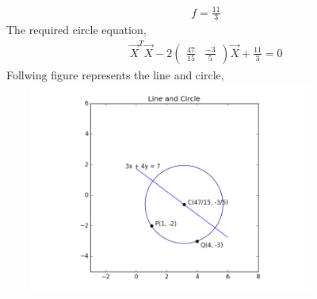 \documentclass[journal,12pt,twocolumn]{IEEEtran}
\newcommand{\myvec}[1]{\ensuremath{\begin{pmatrix}#1\end{pmatrix}}}
\begin{document}
\begin{align}
f = \frac{11}{3}
\end{align}
The required circle equation,
\begin{align}
\vec{X}^T\vec{X}-2\myvec{\frac{47}{15} & \frac{-3}{5} }\vec{X} + \frac{11}{3} = 0
\end{align}
Follwing figure represents the line and circle,
\includegraphics[width=11cm, height=7cm]{figure_1}
\end{document}
